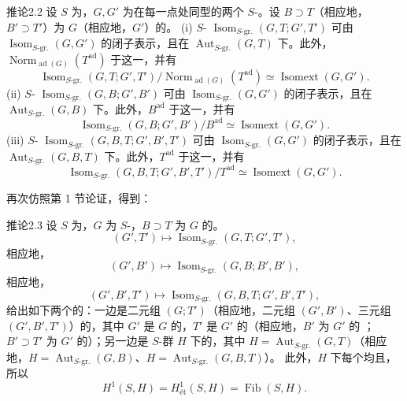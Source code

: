 \begin{SGAresult}{推论}{2.2}
设 $S$ 为，$G,G'$ 为在每一点处同型的两个 $S$-。设 $B\supset T$（相应地，$B'\supset T'$）为 $G$（相应地，$G'$）的。
(i) $S$- $\operatorname{Isom}_{S\text{-gr.}}(G,T;G',T')$ 可由 $\operatorname{Isom}_{S\text{-gr.}}(G,G')$ 的闭子表示，且在 $\operatorname{Aut}_{S\text{-gr.}}(G,T)$ 下。此外，$\operatorname{Norm}_{\operatorname{ad}(G)}(T^{\mathrm{ad}})$ 于这一，并有
\[\operatorname{Isom}_{S\text{-gr.}}(G,T;G',T')/\operatorname{Norm}_{\operatorname{ad}(G)}(T^{\mathrm{ad}})\simeq\operatorname{Isomext}(G,G').\]
(ii) $S$- $\operatorname{Isom}_{S\text{-gr.}}(G,B;G',B')$ 可由 $\operatorname{Isom}_{S\text{-gr.}}(G,G')$ 的闭子表示，且在 $\operatorname{Aut}_{S\text{-gr.}}(G,B)$ 下。此外，$B^{\mathrm{ad}}$ 于这一，并有
\[\operatorname{Isom}_{S\text{-gr.}}(G,B;G',B')/B^{\mathrm{ad}}\simeq\operatorname{Isomext}(G,G').\]
(iii) $S$- $\operatorname{Isom}_{S\text{-gr.}}(G,B,T;G',B',T')$ 可由 $\operatorname{Isom}_{S\text{-gr.}}(G,G')$ 的闭子表示，且在 $\operatorname{Aut}_{S\text{-gr.}}(G,B,T)$ 下。此外，$T^{\mathrm{ad}}$ 于这一，并有
\[\operatorname{Isom}_{S\text{-gr.}}(G,B,T;G',B',T')/T^{\mathrm{ad}}\simeq\operatorname{Isomext}(G,G').\]
\end{SGAresult}
再次仿照第 1 节论证，得到：
\begin{SGAresult}{推论}{2.3}
设 $S$ 为，$G$ 为 $S$-，$B\supset T$ 为 $G$ 的。
\[(G',T')\longmapsto\operatorname{Isom}_{S\text{-gr.}}(G,T;G',T'),\]
相应地，
\[(G',B')\longmapsto\operatorname{Isom}_{S\text{-gr.}}(G,B;B',B'),\]
相应地，
\[(G',B',T')\longmapsto\operatorname{Isom}_{S\text{-gr.}}(G,B,T;G',B',T'),\]
给出如下两个的：一边是二元组 $(G;T')$（相应地，二元组 $(G',B')$、三元组 $(G',B',T')$）的，其中 $G'$ 是 $G$ 的，$T'$ 是 $G'$ 的（相应地，$B'$ 为 $G'$ 的 ；$B'\supset T'$ 为 $G'$ 的）；另一边是 $S$-群 $H$ 下的，其中 $H=\operatorname{Aut}_{S\text{-gr.}}(G,T)$（相应地，$H=\operatorname{Aut}_{S\text{-gr.}}(G,B)$、$H=\operatorname{Aut}_{S\text{-gr.}}(G,B,T)$）。
此外，$H$ 下每个均且，所以
\[H^1(S,H)=H^1_{\text{ét}}(S,H)=\operatorname{Fib}(S,H).\]
\end{SGAresult}
